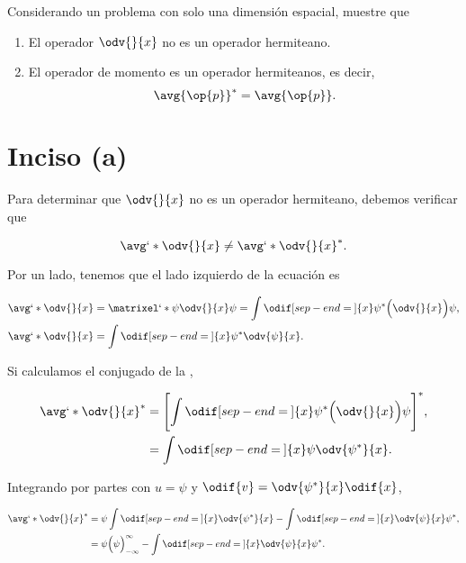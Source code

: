 \documentclass[../main.tex]{subfiles}
\begin{document}
\begin{problema}[10]
	Considerando un problema con solo una dimensión espacial, muestre que

	\begin{enumerate}
		\item El operador \(\odv{}{x}\) no es un operador hermiteano.
		\item El operador de momento es un operador hermiteanos, es decir,
		      \begin{equation*}
			      \avg{\op{p}}^{*} = \avg{\op{p}}.
		      \end{equation*}
	\end{enumerate}

	\startsolution

	\section{Inciso (a)}

	Para determinar  que \(\odv{}{x}\) no es un operador hermiteano, debemos verificar que

	\begin{equation*}
		\avg`*{\odv{}{x}} \neq \avg`*{\odv{}{x}}^{*}.
	\end{equation*}

	Por un lado, tenemos que el lado izquierdo de la ecuación es

	\begin{align}
		\avg`*{\odv{}{x}} & = \matrixel`*{\psi}{\odv{}{x}}{\psi} = \int \odif[sep-end=\medspace]{x} \psi^{*}\Bigl(\odv{}{x}\Bigr)\psi,\nonumber \\
		\avg`*{\odv{}{x}} & = \int \odif[sep-end=\medspace]{x} \psi^{*}\odv{\psi}{x}.\label{eq:avg-psi}
	\end{align}

	Si calculamos el conjugado de la ,

	\begin{align*}
		\avg`*{\odv{}{x}}^{*} & = \Biggl[\int \odif[sep-end=\medspace]{x} \psi^{*}\Bigl(\odv{}{x}\Bigr)\psi\Biggr]^{*},\nonumber \\
		                      & = \int \odif[sep-end=\medspace]{x} \psi \odv{\psi^{*}}{x}.
	\end{align*}

	Integrando por partes con \(u = \psi\) y \( \odif{v} = \odv{\psi^{*}}{x} \odif{x}\),

	\begin{align*}
		\avg`*{\odv{}{x}}^{*} & = \psi \int \odif[sep-end=\medspace]{x} \odv{\psi^{*}}{x} - \int \odif[sep-end=\medspace]{x} \odv{\psi}{x} \psi^{*}, \\
		                      & = \psi \Bigl(\psi\Bigr)_{-\infty}^{\infty} - \int \odif[sep-end=\medspace]{x} \odv{\psi}{x} \psi^{*}.
	\end{align*}


\end{problema}
\end{document}

